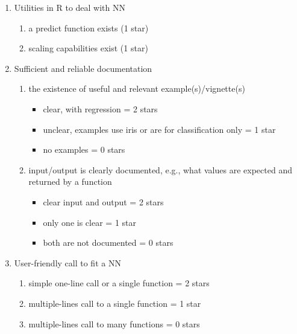 \begin{enumerate}
\def\labelenumi{\arabic{enumi}.}
\tightlist
\item
  Utilities in R to deal with NN

  \begin{enumerate}
  \def\labelenumii{\alph{enumii}.}
  \tightlist
  \item
    a predict function exists (1 star)
  \item
    scaling capabilities exist (1 star)
  \end{enumerate}
\item
  Sufficient and reliable documentation

  \begin{enumerate}
  \def\labelenumii{\alph{enumii}.}
  \tightlist
  \item
    the existence of useful and relevant example(s)/vignette(s)

    \begin{itemize}
    \tightlist
    \item
      clear, with regression = 2 stars
    \item
      unclear, examples use iris or are for classification only = 1 star
    \item
      no examples = 0 stars
    \end{itemize}
  \item
    input/output is clearly documented, e.g., what values are expected
    and returned by a function

    \begin{itemize}
    \tightlist
    \item
      clear input and output = 2 stars
    \item
      only one is clear = 1 star
    \item
      both are not documented = 0 stars
    \end{itemize}
  \end{enumerate}
\item
  User-friendly call to fit a NN

  \begin{enumerate}
  \def\labelenumii{\alph{enumii}.}
  \tightlist
  \item
    simple one-line call or a single function = 2 stars
  \item
    multiple-lines call to a single function = 1 star
  \item
    multiple-lines call to many functions = 0 stars
  \end{enumerate}
\end{enumerate}

